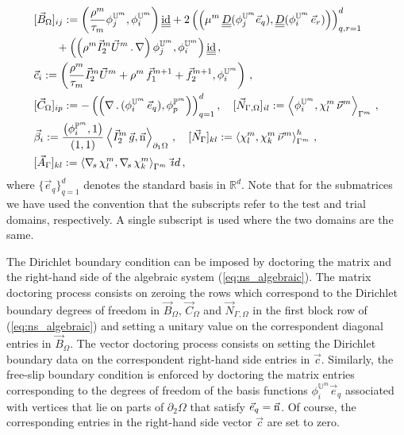 \documentclass[a4paper,12pt,onecolumn]{article}
\newcommand{\R}{\mathbb R}
\newcommand{\uspacesimple}{\mathbb{U}}
\newcommand{\pspace}{\mathbb{P}}
\newcommand{\nabs}{\nabla_{\!s}}
\newcommand{\id}{\rm id}
\newcommand{\Nbulk}{\vec{N}_{\Gamma,\Omega}}
\newcommand{\unitn}{\vec{\rm n}}
\newcommand{\mat}[1]{\underline{\underline{#1}}\rule{0pt}{0pt}}
\begin{document}
\begin{align*}
& [\vec B_\Omega]_{ij} := \left( \frac{\rho^m}{\tau_m}
\phi_j^{\uspacesimple^m}, \phi_i^{\uspacesimple^m} \right)\mat \id
+ 2\left(\left(\mu^m\,\mat D(\phi_j^{\uspacesimple^m} \vec e_q),
\mat D(\phi_i^{\uspacesimple^m}\,\vec e_r) \right) \right)_{q,r=1}^d\\
& \qquad + \left( \left(\rho^m \vec I_2^m\vec U^m\,.\,\nabla \right)
\phi_j^{\uspacesimple^m},
\phi_i^{\uspacesimple^m} \right)\mat \id \,,\\
& \vec c_i := \left( \frac{\rho^m}{\tau_m}\vec I_2^m\vec U^m +
\rho^m\,\vec f_1^{m+1}+\vec f_2^{m+1},\phi_i^{\uspacesimple^m}\right)\,, \\
&[\vec C_\Omega]_{ip} := - \left(
\left(\nabla\,.\,(\phi_i^{\uspacesimple^m}\,\vec
e_q), \phi_p^{\pspace^m} \right) \right)_{q=1}^d,\quad
[\Nbulk]_{il} := \left\langle \phi_i^{\uspacesimple^m}, \chi^m_l \,\vec\nu^m
\right\rangle_{\Gamma^m} \,,\\
& \vec \beta_i := \frac{\left(\phi_i^{\pspace^m},1\right)}{\left(1,1\right)}
\left\langle \vec I_2^m\,\vec g,\unitn\right\rangle_{\partial_1\Omega}\,,\quad
[\vec N_\Gamma]_{kl} := \left\langle \chi^m_l, \chi^m_k\,\vec\nu^m
\right\rangle_{\Gamma^m}^h \,,\\
& [\vec A_\Gamma]_{kl} := \left\langle \nabs\,\chi^m_l, \nabs\,\chi^m_k
\right\rangle_{\Gamma^m} \,\vec\id \,,
\end{align*}
where $\{\vec e_q\}_{q=1}^d$ denotes the standard basis in $\R^d$. Note that
for the submatrices we have used the convention that the subscripts refer to
the test and trial domains, respectively. A single subscript is used where the
two domains are the same.

The Dirichlet boundary condition can be imposed by doctoring the matrix and the
right-hand side of the algebraic system (\ref{eq:ns_algebraic}). The matrix
doctoring process consists on zeroing the rows which correspond to the Dirichlet
boundary degrees of freedom in $\vec B_\Omega$, $\vec C_\Omega$ and $\Nbulk$ in
the first block row of (\ref{eq:ns_algebraic}) and setting a unitary value
on the correspondent diagonal entries in $\vec B_\Omega$. The vector doctoring
process consists on setting the Dirichlet boundary data on the correspondent
right-hand side entries in $\vec c$. Similarly, the free-slip boundary
condition is enforced by doctoring the matrix entries corresponding to
the degrees of freedom of the basis functions
$\phi_i^{\uspacesimple^m}\vec e_q$ associated with vertices that lie on
parts of $\partial_2\Omega$ that satisfy $\vec e_q=\unitn$. Of course,
the corresponding entries in the right-hand side vector $\vec c$ are set to
zero.
\end{document}
